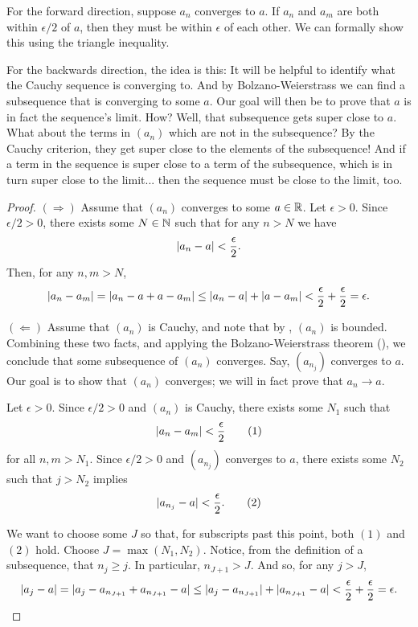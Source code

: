 \begin{proofsketch}
  For the forward direction, suppose $a_n$ converges to $a$. If $a_n$
  and $a_m$ are both within $\epsilon / 2$ of $a$, then they must be
  within $\epsilon$ of each other. We can formally show this using
  the triangle inequality.

  For the backwards direction, the idea is this: It will be helpful
  to identify what the Cauchy sequence is converging to. And by
  Bolzano-Weierstrass we can find a subsequence that is converging to
  some $a$. Our goal will then be to prove that $a$ is in fact the
  sequence's limit. How? Well, that subsequence gets super close to
  $a$. What about the terms in $(a_n)$ which are not in the
  subsequence? By the Cauchy criterion, they get super close to the
  elements of the subsequence! And if a term in the sequence is super
  close to a term of the subsequence, which is in turn super close to
  the limit... then the sequence must be close to the limit, too.
\end{proofsketch}

\begin{proof}
  \phantom{.}

  $(\Rightarrow)$ Assume that $(a_n)$ converges to some $a \in \mathbb R$.
  Let $\epsilon > 0$. Since $\epsilon / 2 > 0$, there exists some $N
  \in \mathbb N$ such that for any $n > N$ we have
  \[
    | a_n - a | < \frac{\epsilon}{2}.
  \]
  Then, for any $n, m > N$,
  \[
    | a_n - a_m | = | a_n - a + a - a_m |
    \leq | a_n - a | + | a - a_m |
    < \frac{\epsilon}{2} + \frac{\epsilon}{2}
    = \epsilon.
  \]

  $(\Leftarrow)$ Assume that $(a_n)$ is Cauchy, and note that by
  , $(a_n)$ is bounded.
  Combining these two facts, and applying the Bolzano-Weierstrass
  theorem (), we conclude that some
  subsequence of $(a_n)$ converges. Say, $(a_{n_j})$ converges to
  $a$. Our goal is to show that $(a_n)$ converges; we will in fact
  prove that $a_n \to a$.

  Let $\epsilon > 0$. Since $\epsilon / 2 > 0$ and $(a_n)$ is Cauchy,
  there exists some $N_1$ such that
  \[
    | a_n - a_m | < \frac{\epsilon}{2} \tag{$1$}
  \]
  for all $n, m > N_1$. Since $\epsilon / 2 > 0$ and $(a_{n_j})$
  converges to $a$, there exists some $N_2$ such that $j > N_2$ implies
  \[
    | a_{n_j} - a | < \frac{\epsilon}{2}. \tag{$2$}
  \]

  We want to choose some $J$ so that, for subscripts past this point,
  both $(1)$ and $(2)$ hold. Choose $J = \max(N_1,
  N_2)$. Notice, from the definition of a subsequence,
  that $n_j \geq j$. In particular, $n_{J+1} > J$. And so, for any $j > J$,
  \[
    | a_j - a | = | a_j - a_{n_{J+1}} + a_{n_{J+1}} - a |
    \leq | a_j - a_{n_{J+1}} | + | a_{n_{J+1}} - a |
    < \frac{\epsilon}{2} + \frac{\epsilon}{2}
    = \epsilon.
  \]
\end{proof}
